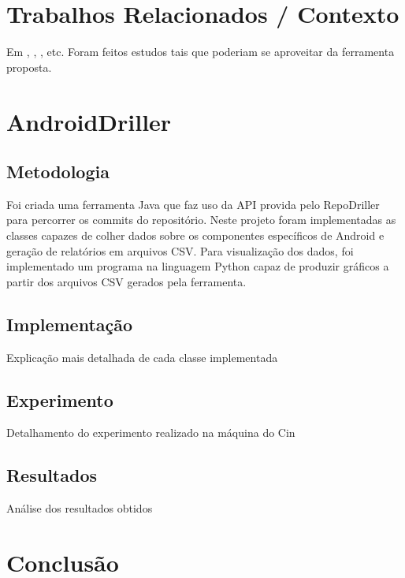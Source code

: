 \documentclass[a4paper,12pt]{article}
\numberwithin{figure}{section}
\begin{document}
\newpage
\section{Trabalhos Relacionados / Contexto}%
Em \cite{Calciati}, \cite{WhoAdded}, \cite{YLyu}, etc. Foram feitos estudos tais que poderiam se aproveitar da ferramenta proposta.




\newpage
\section{AndroidDriller}%

\subsection{Metodologia}

Foi criada uma ferramenta Java que faz uso da API provida pelo RepoDriller para
percorrer os commits do repositório. Neste projeto foram implementadas as
classes capazes de colher dados sobre os componentes específicos de Android e
geração de relatórios em arquivos CSV. Para visualização dos dados, foi
implementado um programa na linguagem Python capaz de produzir gráficos a
partir dos arquivos CSV gerados pela ferramenta.\\

\subsection{Implementação}%
Explicação mais detalhada de cada classe implementada
\subsection{Experimento}%
Detalhamento do experimento realizado na máquina do Cin
\subsection{Resultados}%
Análise dos resultados obtidos

\newpage

\section{Conclusão}%

\newpage
%


\end{document}
